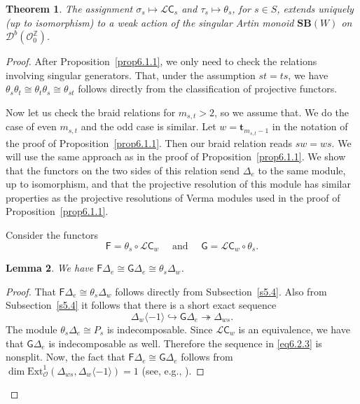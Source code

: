 \documentclass[a4paper]{amsart}
\newtheorem{theorem}{Theorem}
\newtheorem{lemma}[theorem]{Lemma}
\newcommand{\tto}{\twoheadrightarrow}
\begin{document}
\begin{theorem}\label{thm6.2.1}
The assignment $\sigma_s\mapsto \mathcal{L}\mathsf{C}_s$ and
$\tau_s\mapsto \theta_s$, for $s\in S$, extends uniquely
(up to isomorphism) to a weak action of the singular Artin monoid 
$\mathbf{SB}(W)$ on $\mathcal{D}^b(\mathcal{O}_0^\mathbb{Z})$.
\end{theorem}

\begin{proof}
After Proposition~\ref{prop6.1.1}, we only need to check the relations involving singular 
generators. That, under the assumption  $st=ts$, we have 
$\theta_s\theta_t\cong \theta_t\theta_s\cong\theta_{st}$ follows directly from the
classification of projective functors.

Now let us check the braid relations for $m_{s,t}>2$, so we assume that.
We do the case of even $m_{s,t}$ and the odd case is similar.
Let $w=\mathbf{t}_{m_{s,t}-1}$ in the notation of the proof of Proposition~\ref{prop6.1.1}.
Then our braid relation reads  $sw=ws$. We will use the same approach as in the proof of
Proposition~\ref{prop6.1.1}. We show that the functors on the two sides of this relation send
$\Delta_e$ to the same module, up to isomorphism, and that the projective resolution  of 
this module has similar properties as the projective resolutions of Verma modules used
in the proof of Proposition~\ref{prop6.1.1}.

Consider the functors 
\begin{displaymath}
\mathsf{F}=\theta_s\circ\mathcal{L}\mathsf{C}_w\quad\text{ and }\quad
\mathsf{G}=\mathcal{L}\mathsf{C}_w\circ\theta_s.
\end{displaymath}

\begin{lemma}\label{lem6.2.2}
We have $\mathsf{F}\Delta_e\cong \mathsf{G}\Delta_e\cong\theta_s\Delta_w$. 
\end{lemma}

\begin{proof}
That $\mathsf{F}\Delta_e\cong\theta_s\Delta_w$ follows directly from 
Subsection~\ref{s5.4}. Also from Subsection~\ref{s5.4} it follows that 
there is a short exact sequence 
\begin{equation}\label{eq6.2.3}
\Delta_w\langle -1\rangle\hookrightarrow \mathsf{G}\Delta_e\tto \Delta_{ws}.
\end{equation}
The module $\theta_s\Delta_e\cong P_s$ is indecomposable. Since
$\mathcal{L}\mathsf{C}_w$ is an equivalence, we have that 
$\mathsf{G}\Delta_e$ is indecomposable as well.
Therefore the sequence in \eqref{eq6.2.3} is nonsplit.
Now, the fact that $\mathsf{F}\Delta_e\cong \mathsf{G}\Delta_e$
follows from $\dim\mathrm{Ext}^1_{\mathcal{O}}(\Delta_{ws},\Delta_w\langle -1\rangle)=1$
(see, e.g., \cite[Corollary~23]{Ma07}).
\end{proof}


\end{proof}
\end{document}
